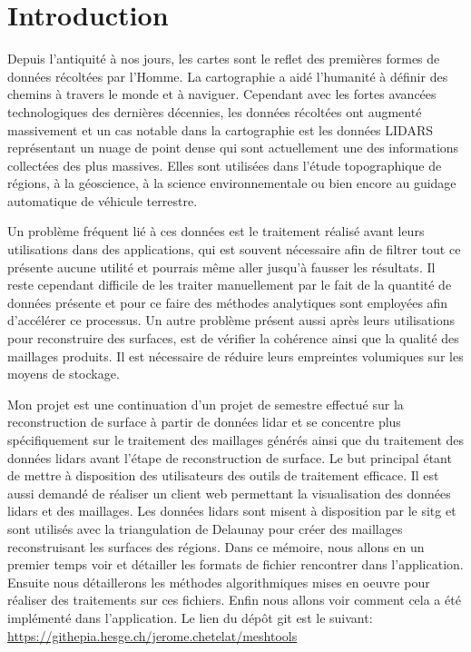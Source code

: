 \chapter*{Introduction}

Depuis l'antiquité à nos jours, les cartes sont le reflet des premières formes de données récoltées par l'Homme.
La cartographie a aidé l'humanité à définir des chemins à travers le monde et à naviguer.
Cependant avec les fortes avancées technologiques des dernières décennies, les données récoltées ont augmenté massivement et un cas notable dans la cartographie est les données LIDARS représentant un nuage de point dense qui sont actuellement une des informations collectées des plus massives.
Elles sont utilisées dans l'étude topographique de régions, à la géoscience, à la science environnementale ou bien encore au guidage automatique de véhicule terrestre.

Un problème fréquent lié à ces données est le traitement réalisé avant leurs utilisations
dans des applications, qui est souvent nécessaire afin de filtrer tout ce présente aucune utilité et pourrais même aller jusqu'à fausser les résultats.
Il reste cependant difficile de les traiter manuellement par le fait de la quantité de données présente et pour ce faire des méthodes analytiques sont employées afin d'accélérer ce processus.
Un autre problème présent aussi après leurs utilisations pour reconstruire des surfaces, est de vérifier la cohérence ainsi que la qualité des maillages produits.
Il est nécessaire de réduire leurs empreintes volumiques sur les moyens de stockage.

Mon projet est une continuation d'un projet de semestre effectué sur la reconstruction de surface à partir de données lidar et se concentre plus spécifiquement sur le traitement des maillages générés ainsi que du traitement des données lidars avant l'étape de reconstruction de surface.
Le but principal étant de mettre à disposition des utilisateurs des outils de traitement efficace.
Il est aussi demandé de réaliser un client web permettant la visualisation des données lidars et des maillages.
Les données lidars sont misent à disposition par le \gls{sitg} et sont utilisés avec la triangulation de Delaunay pour créer des maillages reconstruisant les surfaces des régions.
Dans ce mémoire, nous allons en un premier temps voir et détailler les formats de fichier rencontrer dans l'application.
Ensuite nous détaillerons les méthodes algorithmiques mises en oeuvre pour réaliser des traitements sur ces fichiers.
Enfin nous allons voir comment cela a été implémenté dans l'application. Le lien du dépôt git est le suivant: \href{https://githepia.hesge.ch/jerome.chetelat/meshtools}{https://githepia.hesge.ch/jerome.chetelat/meshtools}